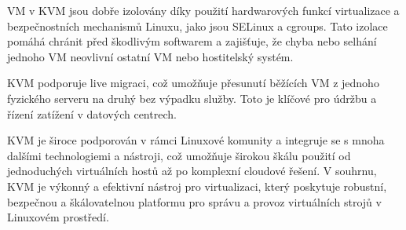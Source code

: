 VM v KVM jsou dobře izolovány díky použití hardwarových funkcí virtualizace a bezpečnostních mechanismů Linuxu, jako jsou SELinux a cgroups.
Tato izolace pomáhá chránit před škodlivým softwarem a zajišťuje, že chyba nebo selhání jednoho VM neovlivní ostatní VM nebo hostitelský systém.

KVM podporuje live migraci, což umožňuje přesunutí běžících VM z jednoho fyzického serveru na druhý bez výpadku služby. Toto je klíčové pro údržbu a řízení zatížení v datových centrech.

KVM je široce podporován v rámci Linuxové komunity a integruje se s mnoha dalšími technologiemi a nástroji, což umožňuje širokou škálu použití od jednoduchých virtuálních hostů až po komplexní cloudové řešení.
V souhrnu, KVM je výkonný a efektivní nástroj pro virtualizaci, který poskytuje robustní, bezpečnou a škálovatelnou platformu pro správu a provoz virtuálních strojů v Linuxovém prostředí.
